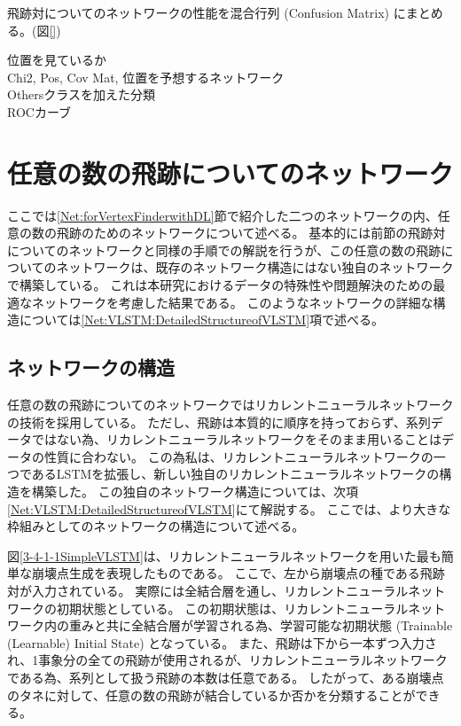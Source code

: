 飛跡対についてのネットワークの性能を混合行列 (Confusion Matrix) にまとめる。(図\ref{})

位置を見ているか\\
Chi2, Pos, Cov Mat, 位置を予想するネットワーク\\

Othersクラスを加えた分類\\

ROCカーブ\\


\section{任意の数の飛跡についてのネットワーク} \label{Net:VertexLSTM}

ここでは\ref{Net:forVertexFinderwithDL}節で紹介した二つのネットワークの内、任意の数の飛跡のためのネットワークについて述べる。
基本的には前節の飛跡対についてのネットワークと同様の手順での解説を行うが、この任意の数の飛跡についてのネットワークは、既存のネットワーク構造にはない独自のネットワークで構築している。
これは本研究におけるデータの特殊性や問題解決のための最適なネットワークを考慮した結果である。
このようなネットワークの詳細な構造については\ref{Net:VLSTM:DetailedStructureofVLSTM}項で述べる。


\subsection{ネットワークの構造} \label{Net:VLSTM:StructureofVLSTM}

任意の数の飛跡についてのネットワークではリカレントニューラルネットワークの技術を採用している。
ただし、飛跡は本質的に順序を持っておらず、系列データではない為、リカレントニューラルネットワークをそのまま用いることはデータの性質に合わない。
この為私は、リカレントニューラルネットワークの一つであるLSTMを拡張し、新しい独自のリカレントニューラルネットワークの構造を構築した。
この独自のネットワーク構造については、次項\ref{Net:VLSTM:DetailedStructureofVLSTM}にて解説する。
ここでは、より大きな枠組みとしてのネットワークの構造について述べる。

図\ref{3-4-1-1SimpleVLSTM}は、リカレントニューラルネットワークを用いた最も簡単な崩壊点生成を表現したものである。
ここで、左から崩壊点の種である飛跡対が入力されている。
実際には全結合層を通し、リカレントニューラルネットワークの初期状態としている。
この初期状態は、リカレントニューラルネットワーク内の重みと共に全結合層が学習される為、学習可能な初期状態 (Trainable (Learnable) Initial State) となっている。
また、飛跡は下から一本ずつ入力され、1事象分の全ての飛跡が使用されるが、リカレントニューラルネットワークである為、系列として扱う飛跡の本数は任意である。
したがって、ある崩壊点のタネに対して、任意の数の飛跡が結合しているか否かを分類することができる。

